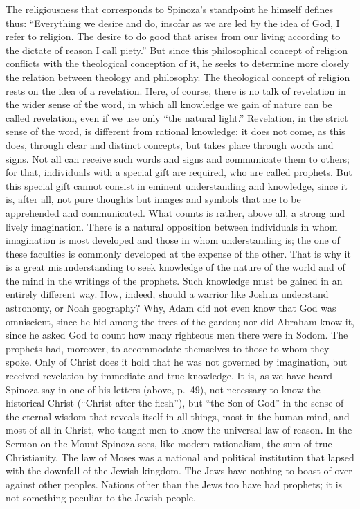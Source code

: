 \documentclass[12pt]{book}
\newcommand{\opage}[1]{\marginnote{\footnotesize\textit{[#1]}}}
\begin{document}
The religiousness that corresponds to Spinoza's standpoint he himself defines thus:
``Everything we desire and do, insofar as we are led by the idea of God, I refer to
religion. The desire to do good that arises from our living according to the dictate of
reason I call piety.'' But since this philosophical concept of religion conflicts with the
theological conception of it, he seeks to determine more closely the relation between
theology and philosophy. The theological concept of religion rests on the idea of a
revelation. Here, of course, there is no talk of revelation in the wider sense of the
word, in which all knowledge we gain of nature can be called revelation, even if we use
only ``the natural light.'' Revelation, in the strict sense of the word, is different from
rational knowledge: it does not come, as this does, through clear and distinct concepts,
but takes place through words and signs. Not all can receive such words and signs and
communicate them to others; for that, individuals with a special gift are required, who
are called prophets. But this special gift cannot consist in eminent understanding and
knowledge, since it is, after all, not pure thoughts but images and symbols that are to
be apprehended and communicated. What counts is rather, above all, a strong and lively
imagination. There is a natural opposition between individuals in whom imagination is
most developed and those in whom understanding is; the one of these faculties is
commonly developed at the expense of the other. That is why it is a great
misunderstanding to seek knowledge of \opage{157}the nature of the world and of the mind
in the writings of the prophets. Such knowledge must be gained in an entirely different
way. How, indeed, should a warrior like Joshua understand astronomy, or Noah geography?
Why, Adam did not even know that God was omniscient, since he hid among the trees of the
garden; nor did Abraham know it, since he asked God to count how many righteous men there
were in Sodom. The prophets had, moreover, to accommodate themselves to those to whom they
spoke. Only of Christ does it hold that he was not governed by imagination, but received
revelation by immediate and true knowledge. It is, as we have heard Spinoza say in one of
his letters (above, p.~49), not necessary to know the historical Christ (``Christ after
the flesh''), but ``the Son of God'' in the sense of the eternal wisdom that reveals itself
in all things, most in the human mind, and most of all in Christ, who taught men to know
the universal law of reason. In the Sermon on the Mount Spinoza sees, like modern
rationalism, the sum of true Christianity. The law of Moses was a national and political
institution that lapsed with the downfall of the Jewish kingdom. The Jews have nothing to
boast of over against other peoples. Nations other than the Jews too have had prophets;
it is not something peculiar to the Jewish people.
\end{document}

